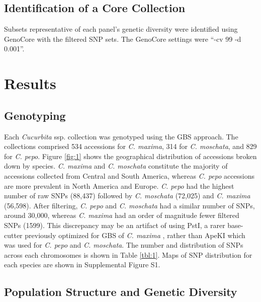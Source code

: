 \documentclass[utf8]{FrontiersinHarvard} %
\begin{document}
\subsection{Identification of a Core Collection}
Subsets representative of each panel’s genetic diversity were identified using GenoCore \citep{Jeong2017} with the filtered SNP sets. The GenoCore settings were “-cv 99 -d 0.001”.


\section{Results}

\subsection{Genotyping}
Each \textit{Cucurbita} ssp. collection was genotyped using the GBS approach. The collections comprised 534 accessions for \textit{C. maxima}, 314 for \textit{C. moschata}, and 829 for \textit{C. pepo}. Figure \ref{fig:1} shows the geographical distribution of accessions broken down by species. \textit{C. maxima} and \textit{C. moschata} constitute the majority of accessions collected from Central and South America, whereas \textit{C. pepo} accessions are more prevalent in North America and Europe. \textit{C. pepo} had the highest number of raw SNPs (88,437) followed by \textit{C. moschata} (72,025) and \textit{C. maxima} (56,598). After filtering, \textit{C. pepo} and \textit{C. moschata} had a similar number of SNPs, around 30,000, whereas \textit{C. maxima} had an order of magnitude fewer filtered SNPs (1599). This discrepancy may be an artifact of using PstI, a rarer base-cutter previously optimized for GBS of \textit{C. maxima} \citep{Zhang2015} , rather than ApeKI which was used for \textit{C. pepo} and \textit{C. moschata}. The number and distribution of SNPs across each chromosomes is shown in Table \ref{tbl:1}. Maps of SNP distribution for each species are shown in Supplemental Figure S1.

\subsection{Population Structure and Genetic Diversity}
\end{document}

